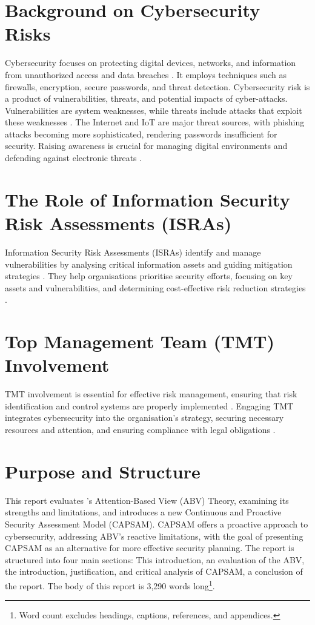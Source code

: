 \section{Background on Cybersecurity Risks}
Cybersecurity focuses on protecting digital devices, networks, and information from unauthorized access and data breaches \citep{mijwil2023exploring}. It employs techniques such as firewalls, encryption, secure passwords, and threat detection. Cybersecurity risk is a product of vulnerabilities, threats, and potential impacts of cyber-attacks. Vulnerabilities are system weaknesses, while threats include attacks that exploit these weaknesses \citep{prasad2020cyber}. The Internet and IoT are major threat sources, with phishing attacks becoming more sophisticated, rendering passwords insufficient for security. Raising awareness is crucial for managing digital environments and defending against electronic threats \citep{mijwil2023exploring}.

\section{The Role of Information Security Risk Assessments (ISRAs)}
Information Security Risk Assessments (ISRAs) identify and manage vulnerabilities by analysing critical information assets and guiding mitigation strategies \citep{shedden2010information}. They help organisations prioritise security efforts, focusing on key assets and vulnerabilities, and determining cost-effective risk reduction strategies \citep{shedden2010information}.

\section{Top Management Team (TMT) Involvement}
TMT involvement is essential for effective risk management, ensuring that risk identification and control systems are properly implemented \citep{fazlida2015information}. Engaging TMT integrates cybersecurity into the organisation's strategy, securing necessary resources and attention, and ensuring compliance with legal obligations \citep{shaikh2023information}.

\section{Purpose and Structure}
This report evaluates \citet{shaikh2023information}'s Attention-Based View (ABV) Theory, examining its strengths and limitations, and introduces a new Continuous and Proactive Security Assessment Model (CAPSAM). CAPSAM offers a proactive approach to cybersecurity, addressing ABV's reactive limitations, with the goal of presenting CAPSAM as an alternative for more effective security planning. The report is structured into four main sections: This introduction, an evaluation of the ABV, the introduction, justification, and critical analysis of CAPSAM, a conclusion of the report. The body of this report is 3,290 words long\footnote{Word count excludes headings, captions, references, and appendices.}.